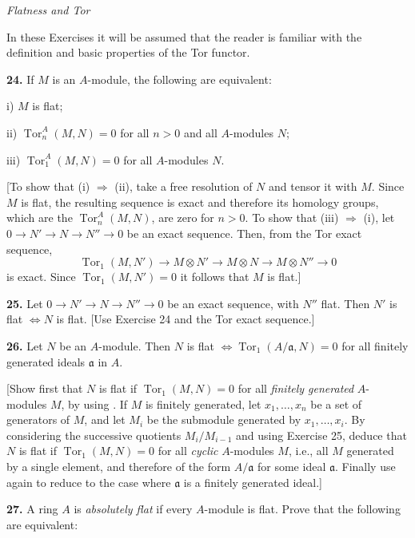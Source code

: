 \medskip
\noindent\emph{Flatness and Tor}

In these Exercises it will be assumed that the reader is familiar with the definition
and basic properties of the Tor functor.

\medskip
\noindent\textbf{24.} If $M$ is an $A$-module, the following are equivalent:

i) $M$ is flat;

ii) $\operatorname{Tor}_n^A(M,N)=0$ for all $n>0$ and all $A$-modules $N$;

iii) $\operatorname{Tor}_1^A(M,N)=0$ for all $A$-modules $N$.

[To show that (i) $\Rightarrow$ (ii), take a free resolution of $N$ and tensor it with $M$.  Since
$M$ is flat, the resulting sequence is exact and therefore its homology groups,
which are the $\operatorname{Tor}_n^A(M,N)$, are zero for $n>0$.  To show that (iii) $\Rightarrow$ (i), let
$0\longrightarrow N'\longrightarrow N\longrightarrow N''\longrightarrow0$ be an exact sequence.  Then, from the Tor exact
sequence,
\[
\operatorname{Tor}_1(M,N')\longrightarrow M\otimes N'\longrightarrow M\otimes N\longrightarrow M\otimes N''\longrightarrow0
\]
is exact.  Since $\operatorname{Tor}_1(M,N')=0$ it follows that $M$ is flat.]

\medskip
\noindent\textbf{25.} Let $0\longrightarrow N'\longrightarrow N\longrightarrow N''\longrightarrow0$ be an exact sequence, with $N''$ flat.  Then $N'$ is
flat $\Longleftrightarrow N$ is flat.  [Use Exercise 24 and the Tor exact sequence.]

\medskip
\noindent\textbf{26.} Let $N$ be an $A$-module.  Then $N$ is flat $\Longleftrightarrow\operatorname{Tor}_1(A/\mathfrak a,N)=0$ for all finitely
generated ideals $\mathfrak a$ in $A$.

[Show first that $N$ is flat if $\operatorname{Tor}_1(M,N)=0$ for all \emph{finitely generated} $A$-modules
$M$, by using .  If $M$ is finitely generated, let $x_1,\ldots,x_n$ be a set of generators
of $M$, and let $M_i$ be the submodule generated by $x_1,\ldots,x_i$.  By considering
the successive quotients $M_i/M_{i-1}$ and using Exercise 25, deduce that $N$ is flat
if $\operatorname{Tor}_1(M,N)=0$ for all \emph{cyclic} $A$-modules $M$, i.e., all $M$ generated by a single
element, and therefore of the form $A/\mathfrak a$ for some ideal $\mathfrak a$.  Finally use  again
to reduce to the case where $\mathfrak a$ is a finitely generated ideal.]

\medskip
\noindent\textbf{27.} A ring $A$ is \emph{absolutely flat} if every $A$-module is flat.  Prove that the following are
equivalent:

